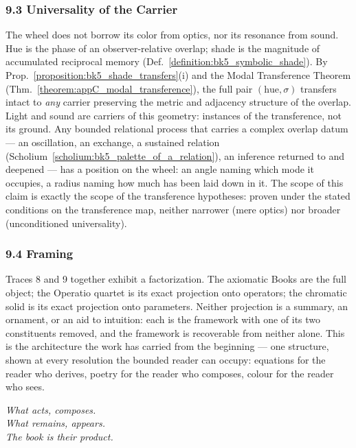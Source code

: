 \subsubsection*{9.3 Universality of the Carrier}

The wheel does not borrow its color from optics, nor its resonance from sound.
Hue is the phase of an observer-relative overlap; shade is the magnitude of
accumulated reciprocal memory (Def.~\ref{definition:bk5_symbolic_shade}). By
Prop.~\ref{proposition:bk5_shade_transfers}(i) and the Modal Transference
Theorem (Thm.~\ref{theorem:appC_modal_transference}), the full pair
$(\mathrm{hue},\sigma)$ transfers intact to \emph{any} carrier preserving the
metric and adjacency structure of the overlap. Light and sound are carriers of
this geometry: instances of the transference, not its ground. Any bounded relational
process that carries a complex overlap datum --- an oscillation, an exchange,
a sustained relation (Scholium~\ref{scholium:bk5_palette_of_a_relation}), an
inference returned to and deepened --- has a position on the wheel: an angle
naming which mode it occupies, a radius naming how much has been laid down in
it. The scope of this claim is exactly the scope of the transference
hypotheses: proven under the stated conditions on the transference map,
neither narrower (mere optics) nor broader (unconditioned universality).

\subsubsection*{9.4 Framing}

Traces 8 and 9 together exhibit a factorization. The axiomatic Books are the
full object; the Operatio quartet is its exact projection onto operators; the
chromatic solid is its exact projection onto parameters. Neither projection
is a summary, an ornament, or an aid to intuition: each is the framework with
one of its two constituents removed, and the framework is recoverable from
neither alone. This is the architecture the work has carried from the
beginning --- one structure, shown at every resolution the bounded reader can
occupy: equations for the reader who derives, poetry for the reader who
composes, colour for the reader who sees.

\begin{flushright}
\emph{What acts, composes.\\
What remains, appears.\\
The book is their product.}
\end{flushright}
